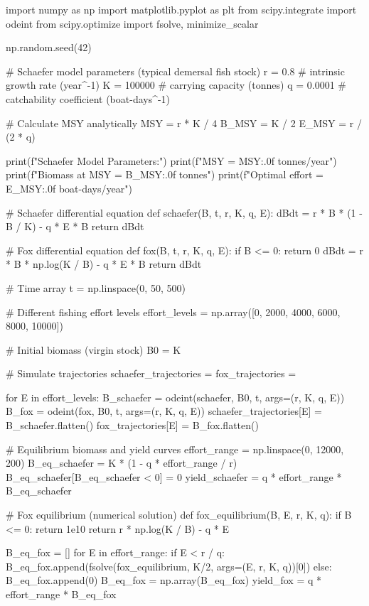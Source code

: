 \documentclass[a4paper, 11pt]{article}
\begin{document}
\begin{pycode}
import numpy as np
import matplotlib.pyplot as plt
from scipy.integrate import odeint
from scipy.optimize import fsolve, minimize_scalar

np.random.seed(42)

# Schaefer model parameters (typical demersal fish stock)
r = 0.8  # intrinsic growth rate (year^-1)
K = 100000  # carrying capacity (tonnes)
q = 0.0001  # catchability coefficient (boat-days^-1)

# Calculate MSY analytically
MSY = r * K / 4
B_MSY = K / 2
E_MSY = r / (2 * q)

print(f"Schaefer Model Parameters:")
print(f"MSY = {MSY:.0f} tonnes/year")
print(f"Biomass at MSY = {B_MSY:.0f} tonnes")
print(f"Optimal effort = {E_MSY:.0f} boat-days/year")

# Schaefer differential equation
def schaefer(B, t, r, K, q, E):
    dBdt = r * B * (1 - B / K) - q * E * B
    return dBdt

# Fox differential equation
def fox(B, t, r, K, q, E):
    if B <= 0:
        return 0
    dBdt = r * B * np.log(K / B) - q * E * B
    return dBdt

# Time array
t = np.linspace(0, 50, 500)

# Different fishing effort levels
effort_levels = np.array([0, 2000, 4000, 6000, 8000, 10000])

# Initial biomass (virgin stock)
B0 = K

# Simulate trajectories
schaefer_trajectories = {}
fox_trajectories = {}

for E in effort_levels:
    B_schaefer = odeint(schaefer, B0, t, args=(r, K, q, E))
    B_fox = odeint(fox, B0, t, args=(r, K, q, E))
    schaefer_trajectories[E] = B_schaefer.flatten()
    fox_trajectories[E] = B_fox.flatten()

# Equilibrium biomass and yield curves
effort_range = np.linspace(0, 12000, 200)
B_eq_schaefer = K * (1 - q * effort_range / r)
B_eq_schaefer[B_eq_schaefer < 0] = 0
yield_schaefer = q * effort_range * B_eq_schaefer

# Fox equilibrium (numerical solution)
def fox_equilibrium(B, E, r, K, q):
    if B <= 0:
        return 1e10
    return r * np.log(K / B) - q * E

B_eq_fox = []
for E in effort_range:
    if E < r / q:
        B_eq_fox.append(fsolve(fox_equilibrium, K/2, args=(E, r, K, q))[0])
    else:
        B_eq_fox.append(0)
B_eq_fox = np.array(B_eq_fox)
yield_fox = q * effort_range * B_eq_fox


\end{pycode}
\end{document}
